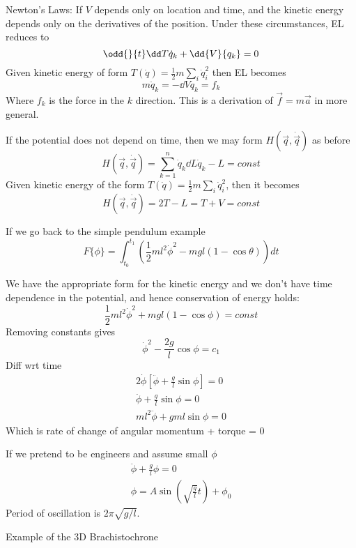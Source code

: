 \documentclass{X:/Documents/Coding/Latex/myassignment}
\begin{document}
Newton's Laws:
If $V$ depends only on location and time, and the kinetic energy depends only on the derivatives of the position. Under these circumstances, EL reduces to
\[\odd{}{t} \dd T{\dot q_k} + \dd{V}{q_k} = 0\]
Given kinetic energy of form $T(\dot q) = \frac12 m \sum_i \dot q_i^2$ then EL becomes
\[m\ddot q_k = -\dd V{q_k} = f_k\]
Where $f_k$ is the force in the $k$ direction.
This is a derivation of $\vec f = m \vec a$ in more general.

If the potential does not depend on time, then we may form $H(\vec q,\dot{\vec q})$ as before
\[H(\vec q,\dot{\vec q}) = \sum_{k=1}^n \dot q_k \dd L{\dot q_k} - L = const\]
Given kinetic energy of the form $T(\dot q) = \frac12 m \sum_i \dot q_i^2$, then it becomes
\[H(\vec q,\dot{\vec q}) = 2T - L = T+V = const\]

If we go back to the simple pendulum example
\[F\{\phi\} = \int_{t_0}^{t_1} \left(\frac12 ml^2 \dot\phi^2 - mgl (1-\cos\theta)\right) dt\]

We have the appropriate form for the kinetic energy and we don't have time dependence in the potential, and hence conservation of energy holds:
\[\frac12 ml^2 \dot\phi^2 + mgl(1-\cos\phi) = const\]
Removing constants gives
\[\dot\phi^2 - \frac{2g}{l} \cos\phi = c_1\]
Diff wrt time
\begin{align*}
	2 \dot \phi [\ddot \phi + \frac gl \sin\phi] = 0\\
	\ddot\phi + \frac gl \sin\phi =0 \\
	ml^2 \ddot \phi + gml \sin\phi = 0	
\end{align*}
Which is rate of change of angular momentum + torque = 0

If we pretend to be engineers and assume small $\phi$
\begin{align*}
	\ddot \phi + \frac gl \phi = 0\\
	\phi = A\sin(\sqrt{\frac gl}t ) + \phi_0 
\end{align*}
Period of oscillation is $2\pi \sqrt{g/l}$.


Example of the 3D Brachistochrone
\end{document}
